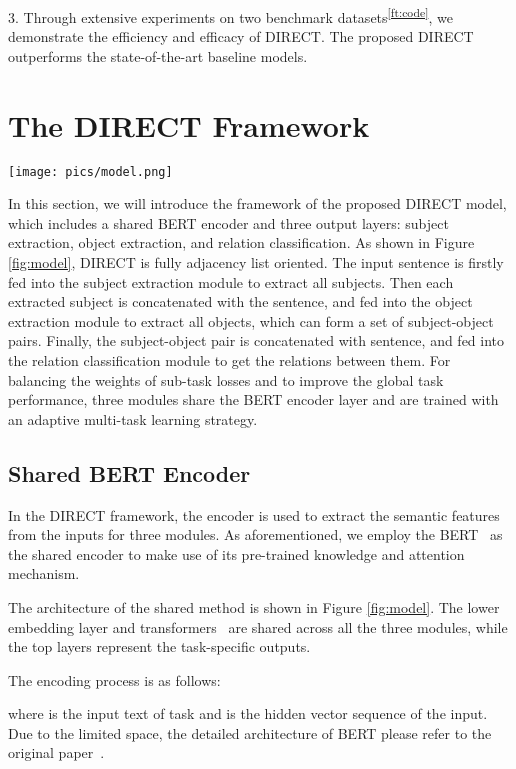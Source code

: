 \documentclass[11pt,a4paper]{article}
\begin{document}
3. Through extensive experiments on two benchmark datasets\textsuperscript{\ref{ft:code}}, we demonstrate the efficiency and efficacy of DIRECT. The proposed DIRECT outperforms the state-of-the-art baseline models. \section{The DIRECT Framework}\label{sec:method}



\begin{figure*}[ht]
\centering
\texttt{[image: pics/model.png]}
\caption{An overview of the proposed DIRECT framework}
\label{fig:model}
\end{figure*}
In this section, we will introduce the framework of the proposed DIRECT model, which includes a shared BERT encoder and three output layers: subject extraction, object extraction, and relation classification. As shown in Figure \ref{fig:model}, DIRECT is fully adjacency list oriented. The input sentence is firstly fed into the subject extraction module to extract all subjects. Then each extracted subject is concatenated with the sentence, and fed into the object extraction module to extract all objects, which can form a set of subject-object pairs. Finally, the subject-object pair is concatenated with sentence, and fed into the relation classification module to get the relations between them. For balancing the weights of sub-task losses and to improve the global task performance, three modules share the BERT encoder layer and are trained with an adaptive multi-task learning strategy. 


\subsection{Shared BERT Encoder}
In the DIRECT framework, the encoder is used to extract the semantic features from the inputs for three modules. As aforementioned, we employ the BERT~\cite{devlin2019bert} as the shared encoder to make use of its pre-trained knowledge and attention mechanism. 

The architecture of the shared method is shown in Figure \ref{fig:model}. The lower embedding layer and transformers~\cite{vaswani2017attention} are shared across all the three modules, while the top layers represent the task-speciﬁc outputs.

The encoding process is as follows:

where  is the input text of task  and  is the hidden vector sequence of the input. Due to the limited space, the detailed architecture of BERT please refer to the original paper~\cite{devlin2019bert}.
\end{document}
